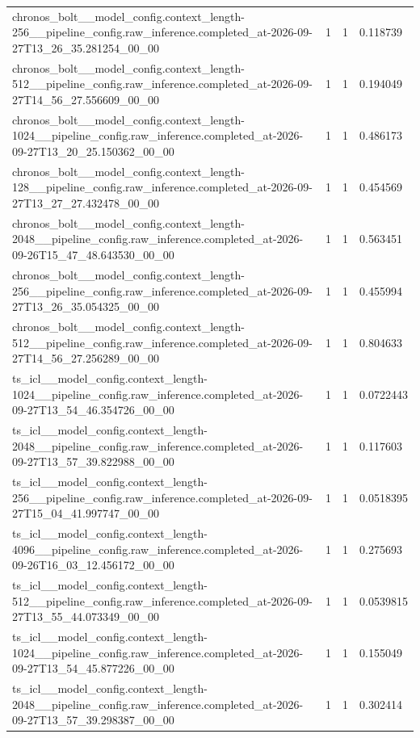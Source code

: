 \begin{tabular}{llll}
chronos\_bolt\_\_model\_config.context\_length-256\_\_pipeline\_config.raw\_inference.completed\_at-2026-09-27T13\_26\_35.281254\_00\_00 & 1 & 1 & 0.118739 \\
chronos\_bolt\_\_model\_config.context\_length-512\_\_pipeline\_config.raw\_inference.completed\_at-2026-09-27T14\_56\_27.556609\_00\_00 & 1 & 1 & 0.194049 \\
chronos\_bolt\_\_model\_config.context\_length-1024\_\_pipeline\_config.raw\_inference.completed\_at-2026-09-27T13\_20\_25.150362\_00\_00 & 1 & 1 & 0.486173 \\
chronos\_bolt\_\_model\_config.context\_length-128\_\_pipeline\_config.raw\_inference.completed\_at-2026-09-27T13\_27\_27.432478\_00\_00 & 1 & 1 & 0.454569 \\
chronos\_bolt\_\_model\_config.context\_length-2048\_\_pipeline\_config.raw\_inference.completed\_at-2026-09-26T15\_47\_48.643530\_00\_00 & 1 & 1 & 0.563451 \\
chronos\_bolt\_\_model\_config.context\_length-256\_\_pipeline\_config.raw\_inference.completed\_at-2026-09-27T13\_26\_35.054325\_00\_00 & 1 & 1 & 0.455994 \\
chronos\_bolt\_\_model\_config.context\_length-512\_\_pipeline\_config.raw\_inference.completed\_at-2026-09-27T14\_56\_27.256289\_00\_00 & 1 & 1 & 0.804633 \\
ts\_icl\_\_model\_config.context\_length-1024\_\_pipeline\_config.raw\_inference.completed\_at-2026-09-27T13\_54\_46.354726\_00\_00 & 1 & 1 & 0.0722443 \\
ts\_icl\_\_model\_config.context\_length-2048\_\_pipeline\_config.raw\_inference.completed\_at-2026-09-27T13\_57\_39.822988\_00\_00 & 1 & 1 & 0.117603 \\
ts\_icl\_\_model\_config.context\_length-256\_\_pipeline\_config.raw\_inference.completed\_at-2026-09-27T15\_04\_41.997747\_00\_00 & 1 & 1 & 0.0518395 \\
ts\_icl\_\_model\_config.context\_length-4096\_\_pipeline\_config.raw\_inference.completed\_at-2026-09-26T16\_03\_12.456172\_00\_00 & 1 & 1 & 0.275693 \\
ts\_icl\_\_model\_config.context\_length-512\_\_pipeline\_config.raw\_inference.completed\_at-2026-09-27T13\_55\_44.073349\_00\_00 & 1 & 1 & 0.0539815 \\
ts\_icl\_\_model\_config.context\_length-1024\_\_pipeline\_config.raw\_inference.completed\_at-2026-09-27T13\_54\_45.877226\_00\_00 & 1 & 1 & 0.155049 \\
ts\_icl\_\_model\_config.context\_length-2048\_\_pipeline\_config.raw\_inference.completed\_at-2026-09-27T13\_57\_39.298387\_00\_00 & 1 & 1 & 0.302414 \\

\end{tabular}
